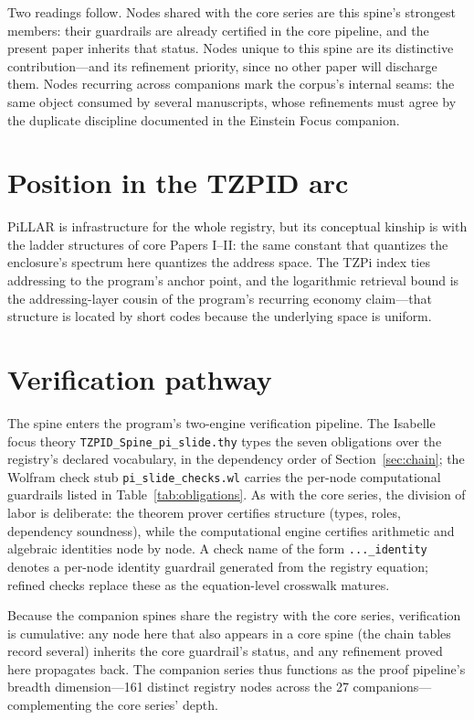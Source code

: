 \documentclass[11pt]{article}
\theoremstyle{remark}
\begin{document}
Two readings follow. Nodes shared with the core series are this spine's strongest members: their guardrails are already certified in the core pipeline, and the present paper inherits that status. Nodes unique to this spine are its distinctive contribution---and its refinement priority, since no other paper will discharge them. Nodes recurring across companions mark the corpus's internal seams: the same object consumed by several manuscripts, whose refinements must agree by the duplicate discipline documented in the Einstein Focus companion.

\section{Position in the TZPID arc}
\label{sec:arc}

PiLLAR is infrastructure for the whole registry, but its conceptual kinship is with the ladder structures of core Papers I--II: the same constant that quantizes the enclosure's spectrum here quantizes the address space. The TZPi index ties addressing to the program's anchor point, and the logarithmic retrieval bound is the addressing-layer cousin of the program's recurring economy claim---that structure is located by short codes because the underlying space is uniform.

\section{Verification pathway}
\label{sec:verify}

The spine enters the program's two-engine verification pipeline. The Isabelle focus theory \texttt{TZPID\_Spine\_pi\_slide.thy} types the seven obligations over the registry's declared vocabulary, in the dependency order of Section~\ref{sec:chain}; the Wolfram check stub \texttt{pi\_slide\_checks.wl} carries the per-node computational guardrails listed in Table~\ref{tab:obligations}. As with the core series, the division of labor is deliberate: the theorem prover certifies structure (types, roles, dependency soundness), while the computational engine certifies arithmetic and algebraic identities node by node. A check name of the form \texttt{...\_identity} denotes a per-node identity guardrail generated from the registry equation; refined checks replace these as the equation-level crosswalk matures.

Because the companion spines share the registry with the core series, verification is cumulative: any node here that also appears in a core spine (the chain tables record several) inherits the core guardrail's status, and any refinement proved here propagates back. The companion series thus functions as the proof pipeline's breadth dimension---161 distinct registry nodes across the 27 companions---complementing the core series' depth.
\end{document}
